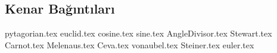 \subsection{Kenar Bağıntıları}
{pytagorian.tex}
\newpage
{euclid.tex}
\newpage
{cosine.tex}
\newpage
{sine.tex}
\newpage
{AngleDivisor.tex}
\newpage
{Stewart.tex}
\newpage
{Carnot.tex}
\newpage
{Melenaus.tex}
\newpage
{Ceva.tex}
\newpage
{vonaubel.tex}
\newpage
{Steiner.tex}
\newpage
{euler.tex}
\newpage
